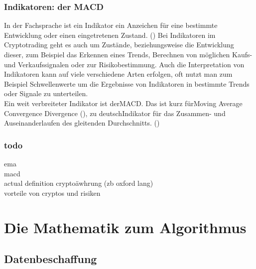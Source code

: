 \documentclass[12pt]{article}
\begin{document}
	\subsubsection{Indikatoren: der MACD}
		In der Fachsprache ist ein Indikator ein Anzeichen für eine bestimmte Entwicklung oder einen eingetretenen Zustand. (\cite{OxfordLanguageIndicator}) Bei Indikatoren im Cryptotrading geht es auch um Zustände, beziehungsweise die Entwicklung dieser, zum Beispiel das Erkennen eines Trends, Berechnen von möglichen Kaufs- und Verkaufssignalen oder zur Risikobestimmung. Auch die Interpretation von Indikatoren kann auf viele verschiedene Arten erfolgen, oft nutzt man zum Beispiel Schwellenwerte um die Ergebnisse von Indikatoren in bestimmte Trends oder Signale zu unterteilen.\\
		Ein weit verbreiteter Indikator ist der\glqq MACD.\grqq{} Das ist kurz für\glqq Moving Average Convergence Divergence\grqq{} (\cite{investopediaMACD}), zu deutsch\glqq Indikator für das Zusammen- und Auseinanderlaufen des gleitenden Durchschnitts.\grqq{} (\cite{wikipediaMACDDeutsch})
	\subsubsection{todo}
		ema \\
		macd\\
		actual definition cryptoäwhrung (zb oxford lang)\\
		vorteile von cryptos und risiken

\section{Die Mathematik zum Algorithmus}
\subsection{Datenbeschaffung}
\end{document}
